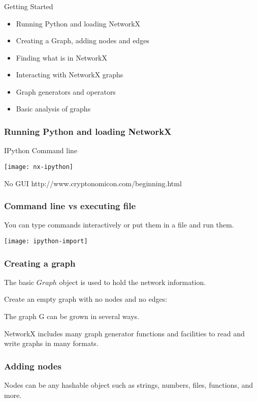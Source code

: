 \begin{frame}
\frametitle{}
\begin{center}
{\fontsize{49}{90}\selectfont
{\color{title} Getting Started}}
\end{center}

\begin{itemize}
\item Running Python and loading NetworkX
\item Creating a Graph, adding nodes and edges
\item Finding what is in NetworkX
\item Interacting with NetworkX graphs
\item Graph generators and operators
\item Basic analysis of graphs
\end{itemize}
\end{frame}

\begin{frame}
\frametitle{Running Python and loading NetworkX}
IPython Command line
\centerline{\texttt{[image: nx-ipython]}}
No GUI \footnotesize{http://www.cryptonomicon.com/beginning.html}
\end{frame}

\begin{frame}
\frametitle{Command line vs executing file}
You can type commands interactively or put them in a file and run them.
\centerline{\texttt{[image: ipython-import]}}
\end{frame}

\begin{frame}
\frametitle{Creating a graph}

The basic $Graph$ object is used to hold the network information.

Create an empty graph with no nodes and no edges:

\begin{block}{}

\end{block}

The graph G can be grown in several ways.

NetworkX includes many graph generator functions
and facilities to read and write graphs in many formats.
\end{frame}


\begin{frame}[fragile]
\frametitle{Adding nodes}

\begin{block}{}

\end{block}

Nodes can be any hashable object such as strings,
numbers, files, functions, and more.

\end{frame}



